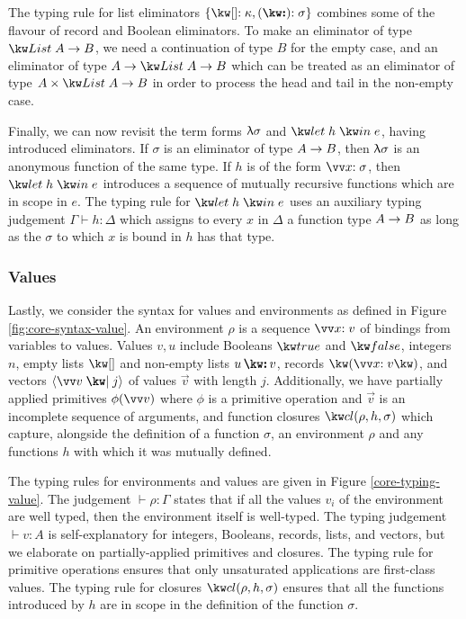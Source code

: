 The typing rule for list eliminators $\elimList{\kappa}{\sigma}$ combines some of the flavour of record and Boolean eliminators. To make an eliminator of type $\tyFun{\tyList{A}}{B}$, we need a continuation of type $B$ for the empty case, and an eliminator of type $\tyFun{A}{\tyFun{\tyList{A}}{B}}$ which can be treated as an eliminator of type $\tyFun{\tyProd{A}{\tyList{A}}}{B}$ in order to process the head and tail in the non-empty case.

Finally, we can now revisit the term forms $\uplambda{\sigma}$ and $\exLetRecMutual{h}{e}$, having introduced eliminators. If $\sigma$ is an eliminator of type ${A}\rightarrow{B}$, then $\uplambda{\sigma}$ is an anonymous function of the same type. If $h$ is of the form $\vec{\bind{x}{\sigma}}$, then $\exLetRecMutual{h}{e}$ introduces a sequence of mutually recursive functions which are in scope in $e$. The typing rule for $\exLetRecMutual{h}{e}$ uses an auxiliary typing judgement $\Gamma \vdash h : \Delta$ which assigns to every $x$ in $\Delta$ a function type ${A}\rightarrow{B}$ as long as the $\sigma$ to which $x$ is bound in $h$ has that type.



\subsubsection{Values}
Lastly, we consider the syntax for values and environments as defined in Figure \ref{fig:core-syntax-value}. An environment $\rho$ is a sequence $\vec{\bind{x}{v}}$ of bindings from variables to values. Values $v, u$ include Booleans $\exTrue$ and $\exFalse$, integers $n$, empty lists $\exNil$ and non-empty lists $\exCons{u}{v}$, records $\exRec{\vec{\bind{x}{v}}}$, and vectors $\exVecVal{\vec{v}}{j}$ of values $\vec{v}$ with length $j$. Additionally, we have partially applied primitives $\exPrimOp{\phi}{\vec{v}}$ where $\phi$ is a primitive operation and $\vec{v}$ is an incomplete sequence of arguments, and function closures $\exClosure{\rho}{h}{\sigma}$ which capture, alongside the definition of a function $\sigma$, an environment $\rho$ and any functions $h$ with which it was mutually defined.


\noindent
The typing rules for environments and values are given in Figure \ref{core-typing-value}. The judgement $\vdash \rho: \Gamma$ states that if all the values $v_i$ of the environment are well typed, then the environment itself is well-typed. The typing judgement $\vdash v: A$ is self-explanatory for integers, Booleans, records, lists, and vectors, but we elaborate on partially-applied primitives and closures. The typing rule for primitive operations ensures that only unsaturated applications are first-class values. The typing rule for closures $\exClosure{\rho}{h}{\sigma}$ ensures that all the functions introduced by $h$ are in scope in the definition of the function $\sigma$.



